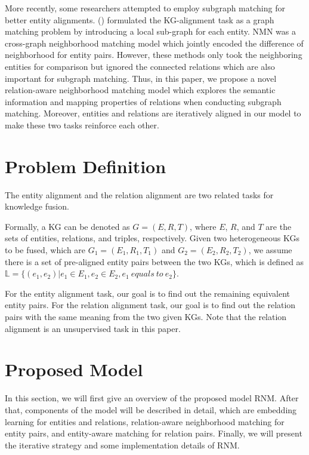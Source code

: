 \documentclass[letterpaper]{article} %
\begin{document}
More recently, some researchers attempted to employ subgraph
matching for better entity alignments. \citeauthor{xu2019cross}
(\citeyear{xu2019cross}) formulated the KG-alignment task as a graph
matching problem by introducing a local sub-graph for each entity.
NMN \cite{wu2020neighborhood} was a cross-graph neighborhood matching
model which jointly encoded the difference of neighborhood for
entity pairs. However, these methods only took the neighboring
entities for comparison but ignored the connected relations which are
also important for subgraph matching. Thus, in this paper, we
propose a novel relation-aware neighborhood matching model which
explores the semantic information and mapping properties of
relations when conducting subgraph matching. Moreover, entities and
relations are iteratively aligned in our model to make these two
tasks reinforce each other.


\section{Problem Definition}

The entity alignment and the relation alignment are two related
tasks for knowledge fusion.

Formally, a KG can be denoted as $G = (E,R,T)$, where $E$, $R$, and
$T$ are the sets of entities, relations, and triples, respectively.
Given two heterogeneous KGs to be fused, which are $G_1 = (E_1, R_1,
T_1)$ and $G_2 = (E_2, R_2, T_2)$, we assume there is a set of
pre-aligned entity pairs between the two KGs, which is defined as
$\mathbb{L} = \{(e_1,e_2) | e_1 \in E_1, e_2 \in E_2, e_1\ equals\
to\ e_2\}$.

For the entity alignment task, our goal is to find out the remaining
equivalent entity pairs. For the relation alignment task, our goal
is to find out the relation pairs with the same meaning from the two
given KGs. Note that the relation alignment is an unsupervised task
in this paper.


\section{Proposed Model}

In this section, we will first give an overview of the proposed
model RNM. After that, components of the model will be described in
detail, which are embedding learning for entities and relations,
relation-aware neighborhood matching for entity pairs, and
entity-aware matching for relation pairs. Finally, we will present
the iterative strategy and some implementation details of RNM.
\end{document}
